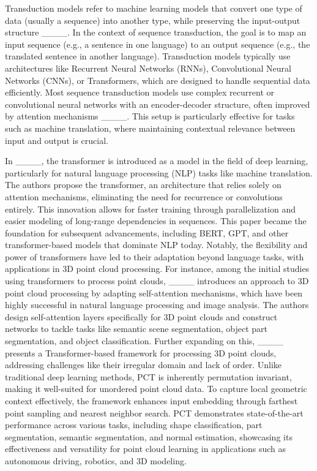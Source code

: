 Transduction models refer to machine learning models that convert one type of data (usually a sequence) into another type, while preserving the input-output structure ____. In the context of sequence transduction, the goal is to map an input sequence (e.g., a sentence in one language) to an output sequence (e.g., the translated sentence in another language). Transduction models typically use architectures like Recurrent Neural Networks (RNNs), Convolutional Neural Networks (CNNs), or Transformers, which are designed to handle sequential data efficiently. Most sequence transduction models use complex recurrent or convolutional neural networks with an encoder-decoder structure, often improved by attention mechanisms ____. This setup is particularly effective for tasks such as machine translation, where maintaining contextual relevance between input and output is crucial.

In ____, the transformer is introduced as a model in the field of deep learning, particularly for natural language processing (NLP) tasks like machine translation. The authors propose the transformer, an architecture that relies solely on attention mechanisms, eliminating the need for recurrence or convolutions entirely. This innovation allows for faster training through parallelization and easier modeling of long-range dependencies in sequences. This paper became the foundation for subsequent advancements, including BERT, GPT, and other transformer-based models that dominate NLP today. Notably, the flexibility and power of transformers have led to their adaptation beyond language tasks, with applications in 3D point cloud processing. For instance, among the initial studies using transformers to process point clouds, ____ introduces an approach to 3D point cloud processing by adapting self-attention mechanisms, which have been highly successful in natural language processing and image analysis. The authors design self-attention layers specifically for 3D point clouds and construct networks to tackle tasks like semantic scene segmentation, object part segmentation, and object classification. Further expanding on this, ____ presents a Transformer-based framework for processing 3D point clouds, addressing challenges like their irregular domain and lack of order. Unlike traditional deep learning methods, PCT is inherently permutation invariant, making it well-suited for unordered point cloud data. To capture local geometric context effectively, the framework enhances input embedding through farthest point sampling and nearest neighbor search. PCT demonstrates state-of-the-art performance across various tasks, including shape classification, part segmentation, semantic segmentation, and normal estimation, showcasing its effectiveness and versatility for point cloud learning in applications such as autonomous driving, robotics, and 3D modeling.

